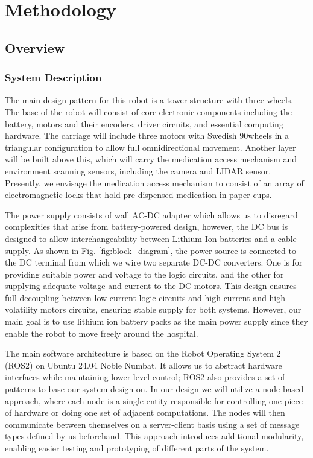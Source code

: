 \documentclass{article}
\begin{document}
\section{Methodology}

\subsection{Overview}

\subsubsection{System Description}
The main design pattern for this robot is a tower structure with three wheels. The base of the robot will consist of core electronic components including the battery, motors and their encoders, driver circuits, and essential computing hardware. The carriage will include three motors with Swedish 90\degree wheels in a triangular configuration to allow full omnidirectional movement.
Another layer will be built above this, which will carry the medication access mechanism and environment scanning sensors, including the camera and LIDAR sensor. Presently, we envisage the medication access mechanism to consist of an array of electromagnetic locks that hold pre-dispensed medication in paper cups.

The power supply consists of wall AC-DC adapter which allows us to disregard complexities that arise from battery-powered design, however, the DC bus is designed to allow interchangeability between Lithium Ion batteries and a cable supply. As shown in Fig. \ref{fig:block_diagram}, the power source is connected to the DC terminal from which we wire two separate DC-DC converters. One is for providing suitable power and voltage to the logic circuits, and the other for supplying adequate voltage and current to the DC motors. This design ensures full decoupling between low current logic circuits and high current and high volatility motors circuits, ensuring stable supply for both systems. However, our main goal is to use lithium ion battery packs as the main power supply since they enable the robot to move freely around the hospital.

The main software architecture is based on the Robot Operating System 2 (ROS2) on Ubuntu 24.04 Noble Numbat. It allows us to abstract hardware interfaces while maintaining lower-level control; ROS2 also provides a set of patterns to base our system design on. In our design we will utilize a node-based approach, where each node is a single entity responsible for controlling one piece of hardware or doing one set of adjacent computations. The nodes will then communicate between themselves on a server-client basis using a set of message types defined by us beforehand. This approach introduces additional modularity, enabling easier testing and prototyping of different parts of the system.
\end{document}
